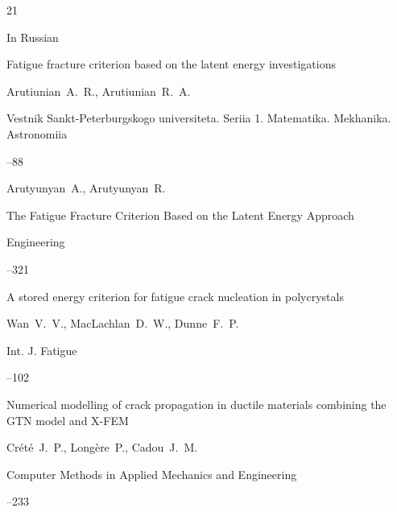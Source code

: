 \begin{thebibliography}{21}






\lang In Russian

\paper Fatigue fracture criterion based on the latent energy investigations

\by Arutiunian~A.~R., Arutiunian~R.~A.

\jour Vestnik Sankt-Peterburgskogo universiteta. Seriia 1. Matematika. Mekhanika. Astronomiia



--88




\by Arutyunyan~A., Arutyunyan~R.

\paper The Fatigue Fracture Criterion Based on the Latent Energy Approach

\jour Engineering




--321





\paper A stored energy criterion for fatigue crack nucleation in polycrystals

\by Wan~V.~V., MacLachlan~D.~W., Dunne~F.~P.

\jour Int. J. Fatigue




--102




\paper Numerical modelling of crack propagation in ductile materials combining the GTN model and X-FEM

\by Cr\'et\'e~J.~P., Long\`ere~P., Cadou~J.~M.

\jour Computer Methods in Applied Mechanics and Engineering



--233


\end{thebibliography}
